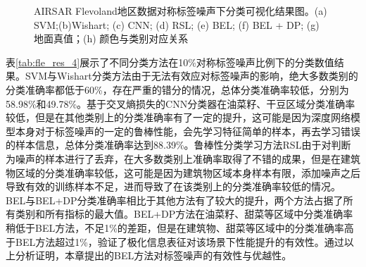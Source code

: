 \begin{figure}[ht]

    \caption{AIRSAR Flevoland地区数据对称标签噪声下分类可视化结果图。(a) SVM;(b)Wishart; (c) CNN; (d) RSL; (e) BEL; (f) BEL + DP; (g) 地面真值；(h) 颜色与类别对应关系}
    \label{fig:fle_res_4}
\end{figure}

表\ref{tab:fle_res_4}展示了不同分类方法在10\%对称标签噪声比例下的分类数值结果。SVM与Wishart分类方法由于无法有效应对标签噪声的影响，绝大多数类别的分类准确率都低于60\%，存在严重的错分的情况，总体分类准确率较低，分别为58.98\%和49.78\%。基于交叉熵损失的CNN分类器在油菜籽、干豆区域分类准确率较低，但是在其他类别上的分类准确率有了一定的提升，这可能是因为深度网络模型本身对于标签噪声的一定的鲁棒性能，会先学习特征简单的样本，再去学习错误的样本信息，总体分类准确率达到88.39\%。鲁棒性分类学习方法RSL由于对判断为噪声的样本进行了丢弃，在大多数类别上准确率取得了不错的成果，但是在建筑物区域的分类准确率较低，这可能是因为建筑物区域本身样本有限，添加噪声之后导致有效的训练样本不足，进而导致了在该类别上的分类准确率较低的情况。BEL与BEL+DP分类准确率相比于其他方法有了较大的提升，两个方法占据了所有类别和所有指标的最大值。BEL+DP方法在油菜籽、甜菜等区域中分类准确率稍低于BEL方法，不足1\%的差距，但是在建筑物、甜菜等区域中的分类准确率高于BEL方法超过1\%，验证了极化信息表征对该场景下性能提升的有效性。通过以上分析证明，本章提出的BEL方法对标签噪声的有效性与优越性。

